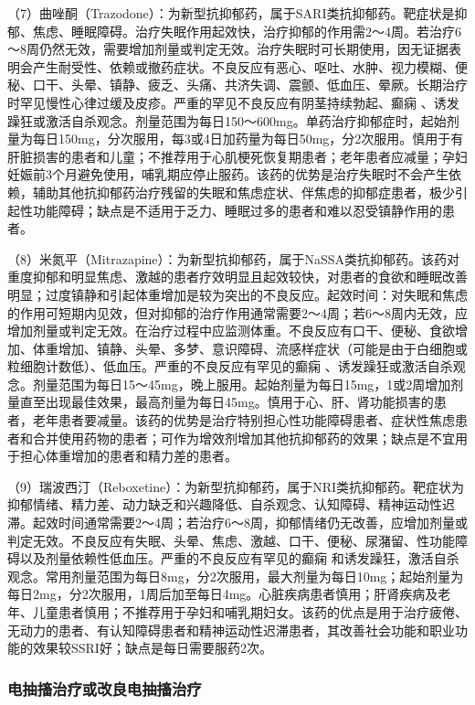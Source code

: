 （7）曲唑酮（Trazodone）：为新型抗抑郁药，属于SARI类抗抑郁药。靶症状是抑郁、焦虑、睡眠障碍。治疗失眠作用起效快，治疗抑郁的作用需2～4周。若治疗6～8周仍然无效，需要增加剂量或判定无效。治疗失眠时可长期使用，因无证据表明会产生耐受性、依赖或撤药症状。不良反应有恶心、呕吐、水肿、视力模糊、便秘、口干、头晕、镇静、疲乏、头痛、共济失调、震颤、低血压、晕厥。长期治疗时罕见慢性心律过缓及皮疹。严重的罕见不良反应有阴茎持续勃起、癫痫
、诱发躁狂或激活自杀观念。剂量范围为每日150～600mg。单药治疗抑郁症时，起始剂量为每日150mg，分次服用，每3或4日加药量为每日50mg，分2次服用。慎用于有肝脏损害的患者和儿童；不推荐用于心肌梗死恢复期患者；老年患者应减量；孕妇妊娠前3个月避免使用，哺乳期应停止服药。该药的优势是治疗失眠时不会产生依赖，辅助其他抗抑郁药治疗残留的失眠和焦虑症状、伴焦虑的抑郁症患者，极少引起性功能障碍；缺点是不适用于乏力、睡眠过多的患者和难以忍受镇静作用的患者。

（8）米氮平（Mitrazapine）：为新型抗抑郁药，属于NaSSA类抗抑郁药。该药对重度抑郁和明显焦虑、激越的患者疗效明显且起效较快，对患者的食欲和睡眠改善明显；过度镇静和引起体重增加是较为突出的不良反应。起效时间：对失眠和焦虑的作用可短期内见效，但对抑郁的治疗作用通常需要2～4周；若6～8周内无效，应增加剂量或判定无效。在治疗过程中应监测体重。不良反应有口干、便秘、食欲增加、体重增加、镇静、头晕、多梦、意识障碍、流感样症状（可能是由于白细胞或粒细胞计数低）、低血压。严重的不良反应有罕见的癫痫
、诱发躁狂或激活自杀观念。剂量范围为每日15～45mg，晚上服用。起始剂量为每日15mg，1或2周增加剂量直至出现最佳效果，最高剂量为每日45mg。慎用于心、肝、肾功能损害的患者，老年患者要减量。该药的优势是治疗特别担心性功能障碍患者、症状性焦虑患者和合并使用药物的患者；可作为增效剂增加其他抗抑郁药的效果；缺点是不宜用于担心体重增加的患者和精力差的患者。

（9）瑞波西汀（Reboxetine）：为新型抗抑郁药，属于NRI类抗抑郁药。靶症状为抑郁情绪、精力差、动力缺乏和兴趣降低、自杀观念、认知障碍、精神运动性迟滞。起效时间通常需要2～4周；若治疗6～8周，抑郁情绪仍无改善，应增加剂量或判定无效。不良反应有失眠、头晕、焦虑、激越、口干、便秘、尿潴留、性功能障碍以及剂量依赖性低血压。严重的不良反应有罕见的癫痫
和诱发躁狂，激活自杀观念。常用剂量范围为每日8mg，分2次服用，最大剂量为每日10mg；起始剂量为每日2mg，分2次服用，1周后加至每日4mg。心脏疾病患者慎用；肝肾疾病及老年、儿童患者慎用；不推荐用于孕妇和哺乳期妇女。该药的优点是用于治疗疲倦、无动力的患者、有认知障碍患者和精神运动性迟滞患者，其改善社会功能和职业功能的效果较SSRI好；缺点是每日需要服药2次。

\subsubsection{电抽搐治疗或改良电抽搐治疗}

